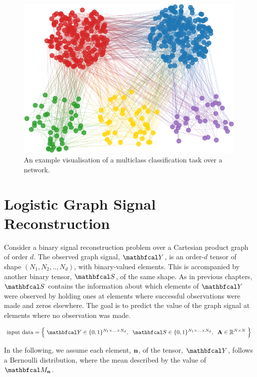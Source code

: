 \begin{figure}[t] 
    \begin{center}
        \includegraphics[width=0.8\linewidth]{Figures/multiclass_graph.pdf}
    \end{center}
   \caption[Visualisation of a multiclass classification task over a network]{An example visualisation of a multiclass classification task over a network.} 
    \label{fig:mutliclass_graph}
\end{figure} 



\section{Logistic Graph Signal Reconstruction}

\label{sec:lgsr}



Consider a binary signal reconstruction problem over a Cartesian product graph of order $d$. The observed graph signal, $\Yt$, is an order-$d$ tensor of shape $(N_1, N_2, .., N_d)$, with binary-valued elements. This is accompanied by another binary tensor, $\St$, of the same shape. As in previous chapters, $\St$ contains the information about which elements of $\Yt$ were observed by holding ones at elements where successful observations were made and zeros elsewhere. The goal is to predict the value of the graph signal at elements where no observation was made. 

\begin{equation*}
    \text{input data} = \Big\{\; \Yt \in \{0, 1\}^{N_1 \times ... \times N_d}, \;\; \St \in \{0, 1\}^{N_1 \times ... \times N_d} , \;\; \A \in \R^{N \times N} \; \Big\}
\end{equation*}

In the following, we assume each element, $\mathbf{n}$, of the tensor, $\Yt$, follows a Bernoulli distribution, where the mean described by the value of $\Mt_\nn$. 

